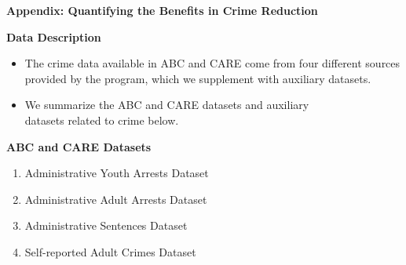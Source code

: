 \documentclass[static]{JJH-Beamer}
\begin{document}
{}
\begin{frame}

\hypertarget{muffin}{}
\begin{block}{}
\begin{center}
\textbf{Appendix: Quantifying the Benefits in Crime Reduction}
\end{center}
\end{block}

\end{frame}

\begin{frame}

\begin{center}
\textbf{Data Description}
\end{center}

\end{frame}

\begin{frame}

\begin{itemize}
\item The crime data available in ABC and CARE come from four different sources provided by the program, which we supplement with auxiliary datasets.
\item We summarize the ABC and CARE datasets and auxiliary\\ datasets related to crime below.
\end{itemize}

\end{frame}

\begin{frame}

\begin{center}
\textbf{ABC and CARE Datasets}
\end{center}
\begin{enumerate}
\item Administrative Youth Arrests Dataset
\item Administrative Adult Arrests Dataset
\item Administrative Sentences Dataset
\item Self-reported Adult Crimes Dataset
\end{enumerate}

\end{frame}
\end{document}
